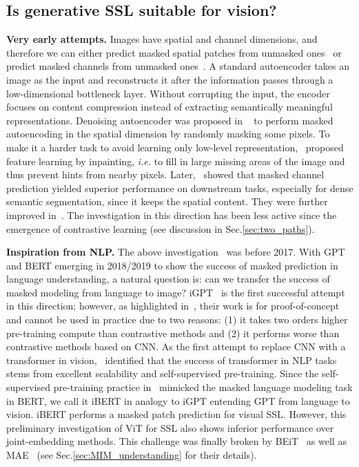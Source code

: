 \documentclass[10pt,journal,compsoc]{IEEEtran}
\begin{document}
\subsection{Is generative SSL suitable for vision?} \label{sec:xxx}

\textbf{Very early attempts.} Images have spatial and channel dimensions, and therefore we can either predict masked spatial patches from unmasked ones~\cite{vincent2008extracting,vincent2010stacked,pathak2016context} or predict masked channels from unmasked ones~\cite{larsson2016learning,larsson2017colorization,zhang2016colorful,zhang2017split}. A standard autoencoder takes an image as the input and reconstructs it after the information passes through a low-dimensional bottleneck layer. Without corrupting the input, the encoder focuses on content compression instead of extracting semantically meaningful representations. Denoising autoencoder was proposed in ~\cite{vincent2008extracting,vincent2010stacked} to perform masked autoencoding in the spatial dimension by randomly masking some pixels. To make it a harder task to avoid learning only low-level representation,~\cite{pathak2016context} proposed feature learning by inpainting, \textit{i.e.} to fill in large missing areas of the image and thus prevent hints from nearby
pixels. Later,~\cite{larsson2016learning,zhang2016colorful} showed that masked channel prediction yielded superior performance on downstream tasks, especially for dense semantic segmentation, since it keeps the spatial content. They were further improved in~\cite{larsson2017colorization,zhang2017split}. The investigation in this direction has been less active since the emergence of contrastive learning (see discussion in Sec.\ref{sec:two_paths}). 


\textbf{Inspiration from NLP.} The above investigation~\cite{vincent2008extracting,vincent2010stacked,pathak2016context,larsson2016learning,larsson2017colorization,zhang2016colorful,zhang2017split} was before 2017. With GPT and BERT emerging in 2018/2019 to show the success of masked prediction in language understanding, a natural question is: can we transfer the success of masked modeling from language to image? iGPT~\cite{chen2020generative} is the first successful attempt in this direction; however, as highlighted in~\cite{chen2020igpt_blog}, their work is for proof-of-concept and cannot be used in practice due to two reasons: (1) it takes two orders higher pre-training compute than contrastive methods and (2) it performs worse than contrastive methods based on CNN. As the first attempt to replace CNN with a transformer in vision,~\cite{dosovitskiy2021an} identified that the success of transformer in NLP tasks stems from excellent scalability and self-supervised pre-training. Since the self-supervised pre-training practice in~\cite{dosovitskiy2021an} mimicked the masked language modeling task in BERT, we call it iBERT in analogy to iGPT entending GPT from language to vision. iBERT performs a masked patch prediction for visual SSL. However, this preliminary investigation of ViT for SSL also shows inferior performance over joint-embedding methods. This challenge was finally broken by BEiT~\cite{bao2022beit} as well as MAE~\cite{he2022masked} (see Sec.\ref{sec:MIM_understanding} for their details). 
\end{document}
